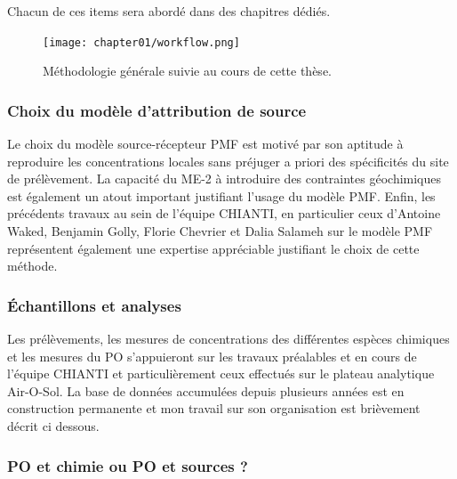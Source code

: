 Chacun de ces items sera abordé dans des chapitres dédiés.

\begin{figure}[ht]
    \centering
    \texttt{[image: chapter01/workflow.png]}
    \caption{Méthodologie générale suivie au cours de cette thèse.}%
    \label{fig:chapter01/workflow}
\end{figure}


\subsubsection{Choix du modèle d'attribution de source}%
\label{ssub:choix_du_modèle_d_attribution_de_source}

Le choix du modèle source-récepteur PMF est motivé par son aptitude à reproduire les
concentrations locales sans préjuger a priori des spécificités du site de prélèvement. La
capacité du ME-2 à introduire des contraintes géochimiques est également un atout
important justifiant l'usage du modèle PMF.
Enfin, les précédents travaux au sein de l'équipe CHIANTI, en particulier ceux d'Antoine Waked, Benjamin Golly,
Florie Chevrier et Dalia Salameh sur le modèle PMF représentent également une expertise
appréciable justifiant le choix de cette méthode.

\subsubsection{Échantillons et analyses}%
\label{ssub:échantillons_et_analyses}

Les prélèvements, les mesures de concentrations des différentes espèces chimiques et les
mesures du PO s'appuieront sur les travaux préalables et en cours de l'équipe CHIANTI et
particulièrement ceux effectués sur le plateau analytique Air-O-Sol.
La base de données accumulées depuis plusieurs années est en construction permanente et mon travail sur son organisation est brièvement décrit ci dessous.

\subsubsection{PO et chimie ou PO et sources ?}%
\label{ssub:chimie_ou_sources_}

